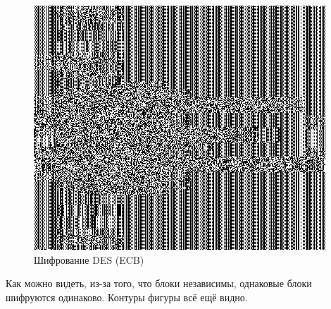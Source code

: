 \documentclass[a4paper, 14pt]{extarticle}
\begin{document}
\begin{itemize}
\begin{figure}[h]
        \centering
        \includegraphics{./img/fio1.jpg}
        \caption{Шифрование DES (ECB)}%
        \label{img:2:3}
    \end{figure}
    Как можно видеть, из-за того, что блоки независимы, однаковые блоки шифруются одинаково. Контуры фигуры всё ещё видно.


\end{itemize}
\end{document}
